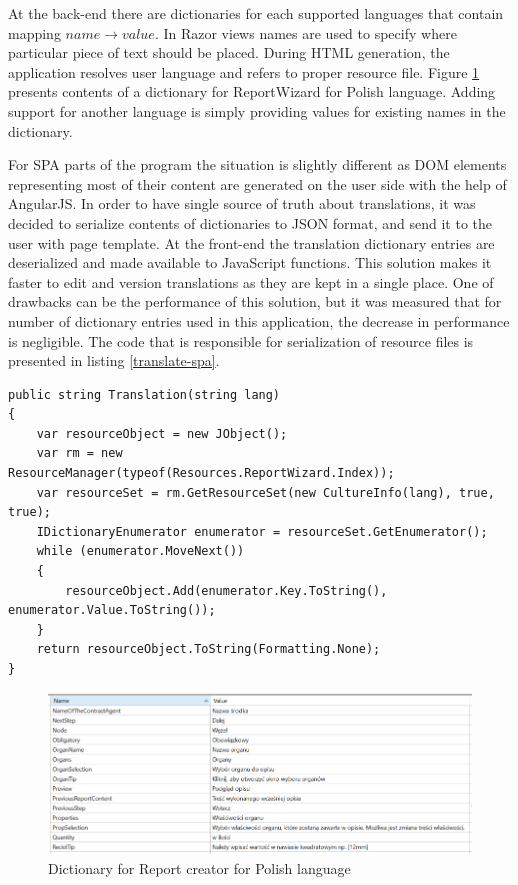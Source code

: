 \documentclass[12pt, twoside, openany]{report}
\theoremstyle{definition}
\begin{document}
At the back-end there are dictionaries for each supported languages that contain mapping $name \to value$. 
In Razor views names are used to specify where particular piece of text should be placed. During HTML generation, the application resolves user language and refers to proper resource file. Figure \ref{fig:language-dictionary} presents contents of a dictionary for ReportWizard for Polish language. Adding support for another language is simply providing values for existing names in the dictionary.

For SPA parts of the program the situation is slightly different as DOM elements representing most of their content are generated on the user side with the help of AngularJS. In order to have single source of truth about translations, it was decided to serialize contents of dictionaries to JSON format, and send it to the user with page template. At the front-end the translation dictionary entries are deserialized and made available to JavaScript functions. This solution makes it faster to edit and version translations as they are kept in a single place. One of drawbacks can be the performance of this solution, but it was measured that for number of dictionary entries used in this application, the decrease in performance is negligible. The code that is responsible for serialization of resource files is presented in listing \ref{translate-spa}.
\pagebreak
\begin{lstlisting}[style=sharpc,caption=Method Translanslation(string lang) serializes all values in a dictionary for a given language and returns a string containing data encoded using JSON format \label{translate-spa}]
public string Translation(string lang)
{
	var resourceObject = new JObject();
	var rm = new ResourceManager(typeof(Resources.ReportWizard.Index));
	var resourceSet = rm.GetResourceSet(new CultureInfo(lang), true, true);
	IDictionaryEnumerator enumerator = resourceSet.GetEnumerator();
	while (enumerator.MoveNext())
	{
		resourceObject.Add(enumerator.Key.ToString(), enumerator.Value.ToString());
	}
	return resourceObject.ToString(Formatting.None);
}
\end{lstlisting}
 
\begin{figure}
    \centering
    \includegraphics[width=1\linewidth]{language-dictionary}
    \caption{Dictionary for Report creator for Polish language\label{fig:language-dictionary}}
\end{figure}
\end{document}

